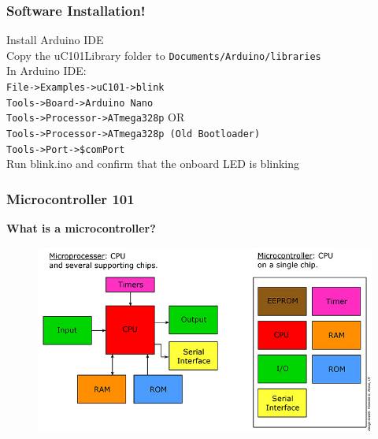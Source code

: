 \documentclass[t]{beamer}
\begin{document}


\begin{frame}[t]
\frametitle{Software Installation!}
Install Arduino  IDE\\
Copy the uC101Library folder to \texttt{Documents/Arduino/libraries}\\
In Arduino IDE:\\
\texttt{File->Examples->uC101->blink}\\
\texttt{Tools->Board->Arduino Nano}\\
\texttt{Tools->Processor->ATmega328p} OR\\
\texttt{Tools->Processor->ATmega328p (Old Bootloader)}\\
\texttt{Tools->Port->\$comPort}\\
Run blink.ino and confirm that the onboard LED is blinking


\end{frame}

\begin{frame}[t]
\frametitle{Microcontroller 101}

\textbf{What is a microcontroller?} 

\begin{figure}
	\includegraphics[scale=0.4]{microProcessorVsController.jpg}
\end{figure}

\end{frame}

\end{document}
